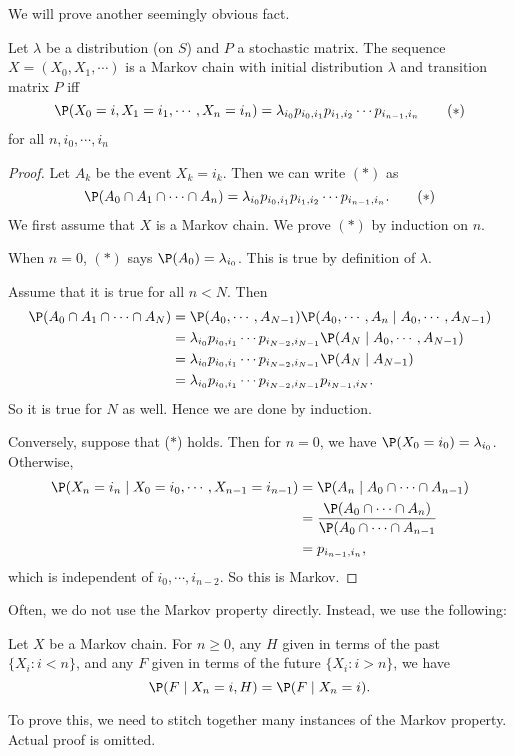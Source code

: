 \documentclass[a4paper]{article}
\begin{document}
We will prove another seemingly obvious fact.
\begin{thm}
  Let $\lambda$ be a distribution (on $S$) and $P$ a stochastic matrix. The sequence $X = (X_0, X_1, \cdots)$ is a Markov chain with initial distribution $\lambda$ and transition matrix $P$ iff
  \[
    \P(X_0 = i, X_1 = i_1, \cdots, X_n = i_n) = \lambda_{i_0}p_{i_0, i_1}p_{i_1, i_2}\cdots p_{i_{n - 1}, i_n}\tag{$*$}
  \]
  for all $n, i_0, \cdots, i_n$
\end{thm}
\begin{proof}
  Let $A_k$ be the event $X_k = i_k$. Then we can write $(*)$ as
  \[
    \P(A_0\cap A_1\cap\cdots \cap A_n) = \lambda_{i_0}p_{i_0, i_1}p_{i_1, i_2}\cdots p_{i_{n - 1}, i_n}. \tag{$*$}
  \]
  We first assume that $X$ is a Markov chain. We prove $(*)$ by induction on $n$.

  When $n = 0$, $(*)$ says $\P(A_0) = \lambda_{i_0}$. This is true by definition of $\lambda$.

  Assume that it is true for all $n < N$. Then
  \begin{align*}
    \P(A_0 \cap A_1 \cap \cdots \cap A_N) &= \P(A_0,\cdots, A_{N - 1})\P(A_0, \cdots, A_n \mid A_0, \cdots, A_{N - 1})\\
    &= \lambda_{i_0} p_{i_0, i_1}\cdots p_{i_{N - 2}, i_{N - 1}} \P(A_{N} \mid A_0,\cdots, A_{N - 1})\\
    &= \lambda_{i_0} p_{i_0, i_1}\cdots p_{i_{N - 2}, i_{N - 1}} \P(A_{N} \mid A_{N - 1})\\
    &= \lambda_{i_0} p_{i_0, i_1}\cdots p_{i_{N - 2}, i_{N - 1}} p_{i_{N - 1}, i_N}.
  \end{align*}
  So it is true for $N$ as well. Hence we are done by induction.

  Conversely, suppose that ($*$) holds. Then for $n = 0$, we have $\P(X_0 = i_0) = \lambda_{i_0}$. Otherwise,
  \begin{align*}
    \P(X_n = i_n\mid X_0 = i_0, \cdots, X_{n - 1} = i_{n - 1}) &= \P(A_n \mid A_0 \cap \cdots\cap A_{n - 1})\\
    &= \frac{\P(A_0\cap \cdots \cap A_n)}{\P(A_0\cap \cdots \cap A_{n - 1}}\\
    &= p_{i_{n - 1}, i_n},
  \end{align*}
  which is independent of $i_0, \cdots, i_{n - 2}$. So this is Markov.
\end{proof}

Often, we do not use the Markov property directly. Instead, we use the following:
\begin{thm}
  Let $X$ be a Markov chain. For $n \geq 0$, any $H$ given in terms of the past $\{X_i: i < n\}$, and any $F$ given in terms of the future $\{X_i: i > n\}$, we have
  \[
    \P(F\mid X_n = i, H) = \P(F\mid X_n = i).
  \]
\end{thm}
To prove this, we need to stitch together many instances of the Markov property. Actual proof is omitted.
\end{document}

